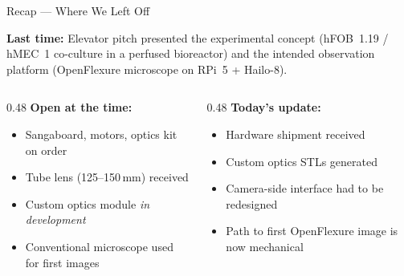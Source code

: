 \documentclass[aspectratio=169,11pt]{beamer}
\begin{document}
\begin{frame}{Recap --- Where We Left Off}

  \textbf{Last time:} Elevator pitch presented the experimental concept
  (hFOB~1.19 / hMEC~1 co-culture in a perfused bioreactor) and the
  intended observation platform (OpenFlexure microscope on RPi~5 + Hailo-8).

  \vspace{0.6em}

  \begin{columns}[T]
    \begin{column}{0.48\textwidth}
      \textbf{Open at the time:}
      \begin{itemize}
        \item Sangaboard, motors, optics kit on order
        \item Tube lens (125--150\,mm) received
        \item Custom optics module \emph{in development}
        \item Conventional microscope used for first images
      \end{itemize}
    \end{column}
    \begin{column}{0.48\textwidth}
      \textbf{Today's update:}
      \begin{itemize}
        \item Hardware shipment received
        \item Custom optics STLs generated
        \item Camera-side interface had to be redesigned
        \item Path to first OpenFlexure image is now mechanical
      \end{itemize}
    \end{column}
  \end{columns}

\end{frame}
\end{document}
